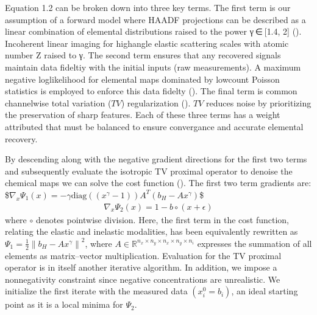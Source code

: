 \documentclass[letterpaper,10pt,english]{jupyterBook}
\begin{document}
\sphinxAtStartPar
Equation 1.2 can be broken down into three key terms. The first term is our assumption of a forward model where HAADF projections can be described as a linear combination of elemental distributions raised to the power γ ∈ {[}1.4, 2{]} (). Incoherent linear imaging for high\sphinxhyphen{}angle elastic scattering scales with atomic number Z raised to γ. The second term ensures that any recovered signals maintain data fideltiy with the initial inputs (raw measurements).  A maximum negative log\sphinxhyphen{}likelihood for elemental maps dominated by low\sphinxhyphen{}count Poisson statistics is employed to enforce this data fidelty (). The final term is common channel\sphinxhyphen{}wise total variation (\(TV\)) regularization (). \(TV\) reduces noise by prioritizing the preservation of sharp features. Each of these three terms has a weight attributed that must be balanced to ensure convergance and accurate elemental recovery.

\sphinxAtStartPar
By descending along with the negative gradient directions for the first two terms and subsequently evaluate the isotropic TV proximal operator to denoise the chemical maps we can solve the cost function ({\hyperref[\detokenize{02_math:10.1109/TIP.2009.2028250}]{}}). The first two term gradients are:
\$\(
\nabla_x \Psi_1(x) = -\gamma \text{diag} \left( (x^\gamma - 1) \right) A^T \left( b_H - Ax^\gamma \right)
\)\$
\begin{equation*}
\begin{split}
\nabla_x \Psi_2(x) = 1 - b \circ (x + \epsilon)
\end{split}
\end{equation*}
\sphinxAtStartPar
where \(\circ\) denotes point\sphinxhyphen{}wise division. Here, the first term in the cost function, relating the elastic and inelastic modalities, has been equivalently re\sphinxhyphen{}written as \(\Psi_1 = \frac{1}{2} \left\| b_H - Ax^\gamma \right\|^2\), where \(A \in \mathbb{R}^{n_x \times n_y \times n_{x} \times n_{y} \times n_i}\) expresses the summation of all elements as matrix–vector multiplication. Evaluation for the TV proximal operator is in itself another iterative algorithm. In addition, we impose a non\sphinxhyphen{}negativity constraint since negative concentrations are unrealistic. We initialize the first iterate with the measured data \((x^0_i = b_i)\), an ideal starting point as it is a local minima for \(\Psi_2\).
\end{document}
